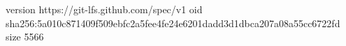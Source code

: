 version https://git-lfs.github.com/spec/v1
oid sha256:5a010c871409f509ebfc2a5fee4fe24e6201dadd3d1dbca207a08a55cc6722fd
size 5566
